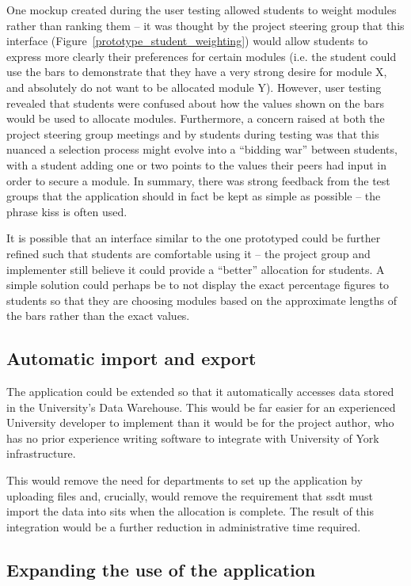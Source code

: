 One mockup created during the user testing allowed students to weight modules
rather than ranking them -- it was thought by the project steering group that
this interface (Figure~\ref{prototype_student_weighting}) would allow students
to express more clearly their preferences for certain modules (i.e. the
student could use the bars to demonstrate that they have a very strong desire
for module X, and absolutely do not want to be allocated module Y). However,
user testing revealed that students were confused about how the values shown
on the bars would be used to allocate modules. Furthermore, a concern raised
at both the project steering group meetings and by students during testing was
that this nuanced a selection process might evolve into a ``bidding war''
between students, with a student adding one or two points to the values their
peers had input in order to secure a module. In summary, there was strong
feedback from the test groups that the application should in fact be kept as
simple as possible -- the phrase \gls{kiss} is often used.

It is possible that an interface similar to the one prototyped could be
further refined such that students are comfortable using it -- the project
group and implementer still believe it could provide a ``better'' allocation
for students. A simple solution could perhaps be to not display the exact
percentage figures to students so that they are choosing modules based on the
approximate lengths of the bars rather than the exact values.

\subsection{Automatic import and export}
\label{sec:autoexport}

The application could be extended so that it automatically accesses data
stored in the University's Data Warehouse. This would be far easier for an
experienced University developer to implement than it would be for the project
author, who has no prior experience writing software to integrate with
University of York infrastructure.

This would remove the need for departments to set up the application by
uploading files and, crucially, would remove the requirement that \gls{ssdt}
must import the data into \gls{sits} when the allocation is complete. The
result of this integration would be a further reduction in administrative time
required.

\subsection{Expanding the use of the application}


